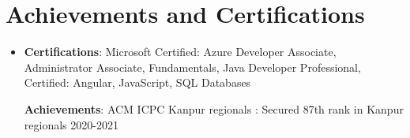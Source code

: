 \documentclass[letterpaper,11pt]{article}
\newcommand{\resumeSubHeadingListStart}{\begin{itemize}[leftmargin=*]}
\newcommand{\resumeSubHeadingListEnd}{\end{itemize}}
\begin{document}

\section{Achievements and Certifications}
 \resumeSubHeadingListStart
   \item{
     \textbf{Certifications}{: Microsoft Certified: Azure Developer Associate, Administrator Associate, Fundamentals, Java Developer Professional, Certified: Angular, JavaScript, SQL Databases   }
     
     \textbf{Achievements}{: ACM ICPC Kanpur regionals : Secured 87th rank in Kanpur regionals 2020-2021}
   }
 \resumeSubHeadingListEnd

 
\end{document}
